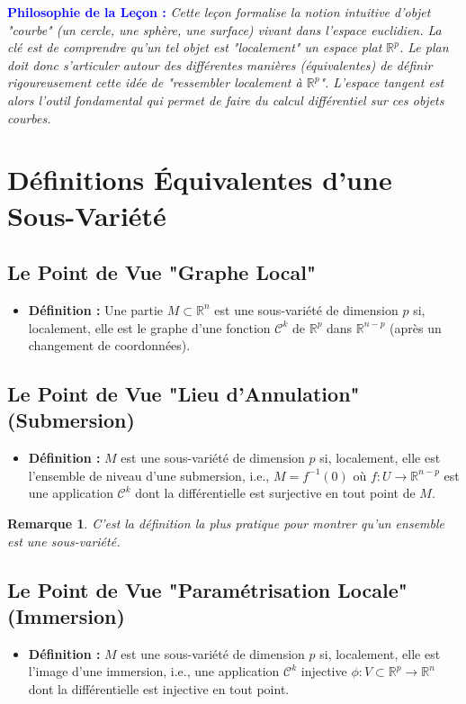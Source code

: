 \documentclass[12pt, a4paper, parskip=full]{report}
\theoremstyle{agregstyle}
\newtheorem{remark}[definition]{Remarque}
\newenvironment{philosophie}
  {\par\medskip\noindent\begin{oframed}\noindent\textbf{\textcolor{blue}{Philosophie de la Leçon :}}\itshape}
  {\end{oframed}\par\medskip}
\begin{document}
\begin{philosophie}
    Cette leçon formalise la notion intuitive d'objet "courbe" (un cercle, une sphère, une surface) vivant dans l'espace euclidien. La clé est de comprendre qu'un tel objet est "localement" un espace plat $\mathbb{R}^p$. Le plan doit donc s'articuler autour des différentes manières (équivalentes) de définir rigoureusement cette idée de "ressembler localement à $\mathbb{R}^p$". L'espace tangent est alors l'outil fondamental qui permet de faire du calcul différentiel sur ces objets courbes.
\end{philosophie}

\section{Définitions Équivalentes d'une Sous-Variété}
\subsection{Le Point de Vue "Graphe Local"}
\begin{itemize}
    \item \textbf{Définition :} Une partie $M \subset \mathbb{R}^n$ est une sous-variété de dimension $p$ si, localement, elle est le graphe d'une fonction $\mathcal{C}^k$ de $\mathbb{R}^p$ dans $\mathbb{R}^{n-p}$ (après un changement de coordonnées).
\end{itemize}

\subsection{Le Point de Vue "Lieu d'Annulation" (Submersion)}
\begin{itemize}
    \item \textbf{Définition :} $M$ est une sous-variété de dimension $p$ si, localement, elle est l'ensemble de niveau d'une submersion, i.e., $M = f^{-1}(0)$ où $f: U \to \mathbb{R}^{n-p}$ est une application $\mathcal{C}^k$ dont la différentielle est surjective en tout point de $M$.
\end{itemize}
\begin{remark}
    C'est la définition la plus pratique pour montrer qu'un ensemble est une sous-variété.
\end{remark}

\subsection{Le Point de Vue "Paramétrisation Locale" (Immersion)}
\begin{itemize}
    \item \textbf{Définition :} $M$ est une sous-variété de dimension $p$ si, localement, elle est l'image d'une immersion, i.e., une application $\mathcal{C}^k$ injective $\phi: V \subset \mathbb{R}^p \to \mathbb{R}^n$ dont la différentielle est injective en tout point.
\end{itemize}
\end{document}
